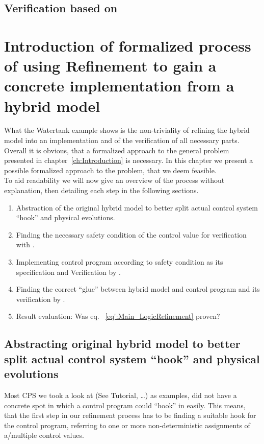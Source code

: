 \section{Verification based on \keym}
\label{sec:Watertank:Verification}

\chapter{Introduction of formalized process of using Refinement to gain a concrete implementation from a hybrid model}
\label{ch:Process}

What the Watertank example shows is the non-triviality of refining the hybrid model into an implementation and of the verification of all necessary parts. Overall it is obvious, that a formalized approach to the general problem presented in chapter~\ref{ch:Introduction} is necessary. In this chapter we present a possible formalized approach to the problem, that we deem feasible.
\\

To aid readability we will now give an overview of the process without explanation, then detailing each step in the following sections. 

\begin{enumerate}
\item Abstraction of the original hybrid model to better split actual control system ``hook'' and physical evolutions.
\item Finding the necessary safety condition of the control value for verification with \keym.
\item Implementing control program according to safety condition as its specification and Verification by \key.
\item Finding the correct ``glue'' between hybrid model and control program and its verification by \keym.
\item Result evaluation: Was eq. ~\ref{eq':Main_LogicRefinement} proven?
\end{enumerate}

\section{Abstracting original hybrid model to better split actual control system ``hook'' and physical evolutions}
\label{sec:Process:Hook}
Most CPS we took a look at (See \cite{keymaera} Tutorial, \cite[p.~5, p.~11]{platzer2010b} \dots) as examples, did not have a concrete spot in which a control program could ``hook'' in easily. This means, that the first step in our refinement process has to be finding a suitable hook for the control program, referring to one or more non-deterministic assignments of a/multiple control values.

